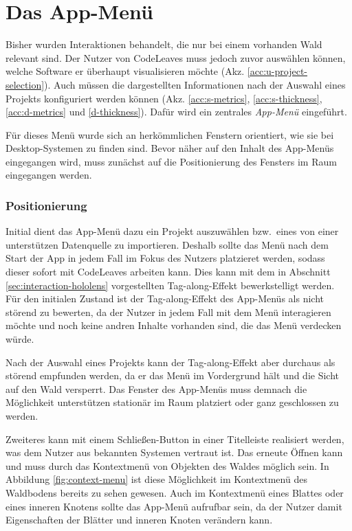 \section{Das App-Menü}
\label{sec:app-menu}

Bisher wurden Interaktionen behandelt, die nur bei einem vorhanden Wald relevant sind. Der Nutzer von CodeLeaves muss jedoch zuvor auswählen können, welche Software er überhaupt visualisieren möchte (Akz. \ref{acc:u-project-selection}). Auch müssen die dargestellten Informationen nach der Auswahl eines Projekts konfiguriert werden können (Akz. \ref{acc:s-metrics}, \ref{acc:s-thickness}, \ref{acc:d-metrics} und \ref{d-thickness}). Dafür wird ein zentrales \textit{App-Menü} eingeführt.

Für dieses Menü wurde sich an herkömmlichen Fenstern orientiert, wie sie bei Desktop-Systemen zu finden sind. Bevor näher auf den Inhalt des App-Menüs eingegangen wird, muss zunächst auf die Positionierung des Fensters im Raum eingegangen werden.

\subsubsection*{Positionierung}

Initial dient das App-Menü dazu ein Projekt auszuwählen bzw.\ eines von einer unterstützen Datenquelle zu importieren. Deshalb sollte das Menü nach dem Start der App in jedem Fall im Fokus des Nutzers platzieret werden, sodass dieser sofort mit CodeLeaves arbeiten kann. Dies kann mit dem in Abschnitt \ref{sec:interaction-hololens} vorgestellten Tag-along-Effekt bewerkstelligt werden. Für den initialen Zustand ist der Tag-along-Effekt des App-Menüs als nicht störend zu bewerten, da der Nutzer in jedem Fall mit dem Menü interagieren möchte und noch keine andren Inhalte vorhanden sind, die das Menü verdecken würde.

Nach der Auswahl eines Projekts kann der Tag-along-Effekt aber durchaus als störend empfunden werden, da er das Menü im Vordergrund hält und die Sicht auf den Wald versperrt. Das Fenster des App-Menüs muss demnach die Möglichkeit unterstützen stationär im Raum platziert oder ganz geschlossen zu werden.

Zweiteres kann mit einem Schließen-Button in einer Titelleiste realisiert werden, was dem Nutzer aus bekannten Systemen vertraut ist. Das erneute Öffnen kann und muss durch das Kontextmenü von Objekten des Waldes möglich sein. In Abbildung \ref{fig:context-menu} ist diese Möglichkeit im Kontextmenü des Waldbodens bereits zu sehen gewesen. Auch im Kontextmenü eines Blattes oder eines inneren Knotens sollte das App-Menü aufrufbar sein, da der Nutzer damit Eigenschaften der Blätter und inneren Knoten verändern kann.


